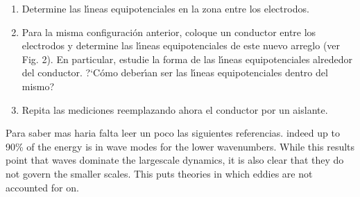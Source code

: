 \documentclass[laboratorio]{guia}
\begin{document}
\begin{enumerate}
    \item Determine las l\'\i neas equipotenciales en la zona entre los electrodos.
    \item Para la misma configuraci\'on anterior, coloque un conductor entre los electrodos y determine las l\'\i neas equipotenciales de este nuevo arreglo (ver Fig. 2). En particular, estudie la forma de las  l\'\i neas equipotenciales alrededor del conductor. ?`C\'omo deber\'\i an ser las l\'\i neas equipotenciales dentro del mismo?  
    \item Repita las mediciones reemplazando ahora el conductor por un aislante. 
\end{enumerate}

\begin{sabermas} Para saber mas haria falta leer un poco las siguientes
    referencias.  indeed up to 90\% of the energy is in wave modes for the
    lower wavenumbers. While this results point that waves dominate the
    largescale dynamics, it is also clear that they do not govern the smaller
    scales.  This puts theories in which eddies are not accounted for on.
\end{sabermas}

%  
\end{document}
